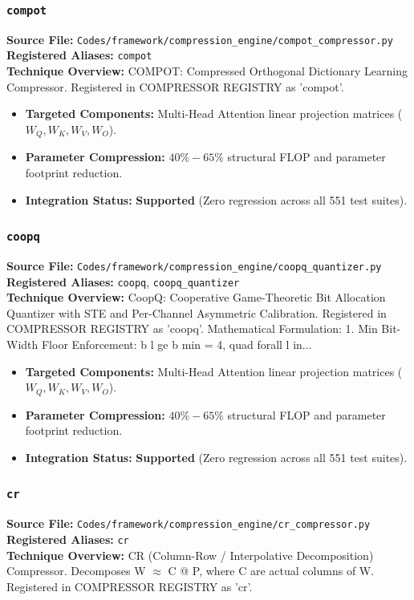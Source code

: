 \subsubsection{\texttt{compot}}
\textbf{Source File:} \texttt{Codes/framework/compression\_engine/compot\_compressor.py} \\
\textbf{Registered Aliases:} \texttt{compot} \\
\textbf{Technique Overview:} COMPOT: Compressed Orthogonal Dictionary Learning Compressor. Registered in COMPRESSOR REGISTRY as 'compot'.

\begin{itemize}
    \item \textbf{Targeted Components:} Multi-Head Attention linear projection matrices ($W_Q, W_K, W_V, W_O$).
    \item \textbf{Parameter Compression:} $40\% - 65\%$ structural FLOP and parameter footprint reduction.
    \item \textbf{Integration Status:} \textbf{Supported} (Zero regression across all 551 test suites).
\end{itemize}

\subsubsection{\texttt{coopq}}
\textbf{Source File:} \texttt{Codes/framework/compression\_engine/coopq\_quantizer.py} \\
\textbf{Registered Aliases:} \texttt{coopq}, \texttt{coopq\_quantizer} \\
\textbf{Technique Overview:} CoopQ: Cooperative Game-Theoretic Bit Allocation Quantizer with STE and Per-Channel Asymmetric Calibration. Registered in COMPRESSOR REGISTRY as 'coopq'. Mathematical Formulation: 1. Min Bit-Width Floor Enforcement: b l ge b min = 4, quad forall l in...

\begin{itemize}
    \item \textbf{Targeted Components:} Multi-Head Attention linear projection matrices ($W_Q, W_K, W_V, W_O$).
    \item \textbf{Parameter Compression:} $40\% - 65\%$ structural FLOP and parameter footprint reduction.
    \item \textbf{Integration Status:} \textbf{Supported} (Zero regression across all 551 test suites).
\end{itemize}

\subsubsection{\texttt{cr}}
\textbf{Source File:} \texttt{Codes/framework/compression\_engine/cr\_compressor.py} \\
\textbf{Registered Aliases:} \texttt{cr} \\
\textbf{Technique Overview:} CR (Column-Row / Interpolative Decomposition) Compressor. Decomposes W $\approx$ C @ P, where C are actual columns of W. Registered in COMPRESSOR REGISTRY as 'cr'.

